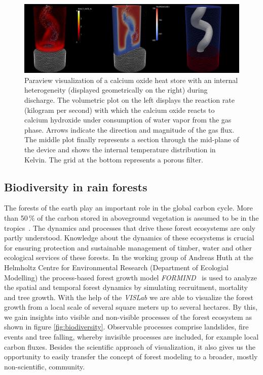\documentclass[twocolumn]{svjour3}          %
\begin{document}
\begin{figure}[htb]
  \includegraphics[width=\linewidth]{images/energy_storage.png}
  \caption{Paraview visualization of a calcium oxide heat store with an internal heterogeneity (displayed geometrically on the right) during discharge. The volumetric plot on the left displays the reaction rate (kilogram per second) with which the calcium oxide reacts to calcium hydroxide under consumption of water vapor from the gas phase. Arrows indicate the direction and magnitude of the gas flux. The middle plot finally represents a section through the mid-plane of the device and shows the internal temperature distribution in Kelvin. The grid at the bottom represents a porous filter.}
\label{fig:energy_storage}
\end{figure}


\subsection{Biodiversity in rain forests}
\label{biodiversity-in-rain-forests}

The forests of the earth play an important role in the global carbon cycle. More than 50\,\% of the carbon stored in aboveground vegetation is assumed to be in the tropics~\cite{pan:carbon-sinks}. The dynamics and processes that drive these forest ecosystems are only partly understood. Knowledge about the dynamics of these ecosystems is crucial for ensuring protection and sustainable management of timber, water and other ecological services of these forests. In the working group of Andreas Huth at the Helmholtz Centre for Environmental Research (Department of Ecologial Modelling) the process-based forest growth model \emph{FORMIND}~\cite{huth:1,huth:2} is used to analyze the spatial and temporal forest dynamics by simulating recruitment, mortality and tree growth. With the help of the \emph{VISLab} we are able to visualize the forest growth from a local scale of several square meters up to several hectares. By this, we gain insights into visible and non-visible processes of the forest ecosystem as shown in figure \ref{fig:biodiversity}. Observable processes comprise landslides, fire events and tree falling, whereby invisible processes are included, for example local carbon fluxes. Besides the scientific approach of visualization, it also gives us the opportunity to easily transfer the concept of forest modeling to a broader, mostly non-scientific, community.
\end{document}
